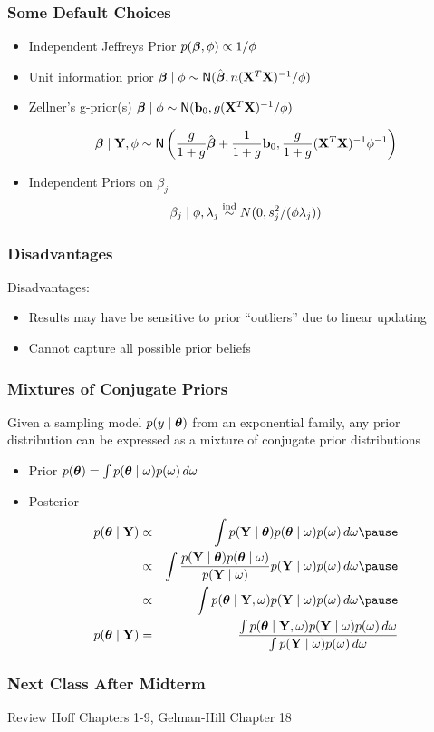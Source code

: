 \documentclass[handout]{beamer}\usepackage[]{graphicx}\usepackage[]{color}
\begin{document}
\begin{frame}
  \frametitle{Some Default Choices}
  \begin{itemize}
  \item Independent Jeffreys Prior $p(\boldsymbol{\beta}, \phi) \propto 1/\phi$
  \item Unit information prior $\boldsymbol{\beta} \mid \phi \sim \textsf{N}(\hat{\boldsymbol{\beta}}, n
    (\mathbf{X}^T\mathbf{X})^{-1}/\phi)$ \pause
\item  Zellner's g-prior(s) $\boldsymbol{\beta} \mid \phi \sim \textsf{N}(\mathbf{b}_0, g
    (\mathbf{X}^T\mathbf{X})^{-1}/\phi)$ \pause

$$\boldsymbol{\beta} \mid \mathbf{Y}, \phi \sim \textsf{N}\left( \frac{g}{1 + g} \hat{\boldsymbol{\beta}} +  \frac{1}{1 + g}
\mathbf{b}_0, \frac{g}{1 + g} (\mathbf{X}^T\mathbf{X})^{-1} \phi^{-1} \right)$$ \pause
\item Independent Priors on $\beta_j$
$$\beta_j \mid \phi, \lambda_j \mathrel{\mathop{\sim}\limits^{\rm ind}} N(0, s^2_j /(\phi \lambda_j))$$
\end{itemize}

\end{frame}
\begin{frame}
  \frametitle{Disadvantages}
  Disadvantages: \pause
\begin{itemize}
\item Results  may have be sensitive to prior ``outliers'' due to
  linear updating \pause
\vspace{2.25in}

\item Cannot capture all possible prior beliefs \pause
\end{itemize}


\end{frame}
\begin{frame}
  \frametitle{Mixtures of Conjugate Priors}
  \begin{theorem}  Given a sampling model
  $p(y \mid \boldsymbol{\theta})$ from an exponential family, any prior distribution
  can be expressed as a mixture of conjugate prior distributions
 \end{theorem}

 \begin{itemize}
 \item Prior $p(\boldsymbol{\theta}) = \int p(\boldsymbol{\theta} \mid \omega) p(\omega)\, d \omega$ \pause
 \item Posterior \pause
   \begin{eqnarray*}
   p(\t \mid \Y)  &\propto & \int p(\Y \mid \t) p(\t \mid \omega)
   p(\omega) \, d\omega \pause \\
 & \propto & \int  \frac{  p(\Y \mid \t) p(\t \mid \omega) } {p(\Y \mid
   \omega)}  p(\Y \mid
 \omega) p(\omega ) \, d \omega  \pause \\
& \propto & \int p(\t \mid \Y, \omega)  p(\Y \mid
 \omega) p(\omega ) \, d \omega \pause \\
 p(\t \mid \Y) & =  & \frac{\int p(\t \mid \Y, \omega)  p(\Y \mid
 \omega) p(\omega ) \, d \omega }
{\int p(\Y \mid
 \omega) p(\omega ) \, d \omega }
       \end{eqnarray*}

 \end{itemize}
\end{frame}
\begin{frame}
  \frametitle{Next Class After Midterm}
  Review Hoff Chapters 1-9,  Gelman-Hill Chapter 18
\end{frame}
\end{document}
